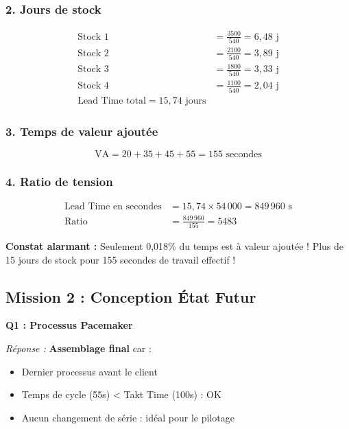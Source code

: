\documentclass[12pt,a4paper]{article}
\begin{document}
\subsubsection{2. Jours de stock}

\begin{align*}
    \text{Stock 1} &= \frac{3500}{540} = 6{,}48 \text{ j} \\
    \text{Stock 2} &= \frac{2100}{540} = 3{,}89 \text{ j} \\
    \text{Stock 3} &= \frac{1800}{540} = 3{,}33 \text{ j} \\
    \text{Stock 4} &= \frac{1100}{540} = 2{,}04 \text{ j} \\[0.3cm]
    \boxed{\text{Lead Time total} = 15{,}74 \text{ jours}}
\end{align*}

\subsubsection{3. Temps de valeur ajoutée}

\begin{equation*}
    \text{VA} = 20 + 35 + 45 + 55 = \boxed{155 \text{ secondes}}
\end{equation*}

\subsubsection{4. Ratio de tension}

\begin{align*}
    \text{Lead Time en secondes} &= 15{,}74 \times 54\,000 = 849\,960 \text{ s} \\
    \text{Ratio} &= \frac{849\,960}{155} = \boxed{5483}
\end{align*}

\begin{tcolorbox}[colback=red!10, colframe=red!50!black]
\textbf{Constat alarmant :} Seulement 0,018\% du temps est à valeur ajoutée ! Plus de 15 jours de stock pour 155 secondes de travail effectif !
\end{tcolorbox}

\subsection{Mission 2 : Conception État Futur}

\textbf{Q1 : Processus Pacemaker}

\textit{Réponse :} \textbf{Assemblage final} car :
\begin{itemize}
    \item Dernier processus avant le client
    \item Temps de cycle (55s) < Takt Time (100s) : OK
    \item Aucun changement de série : idéal pour le pilotage
\end{itemize}
\end{document}
